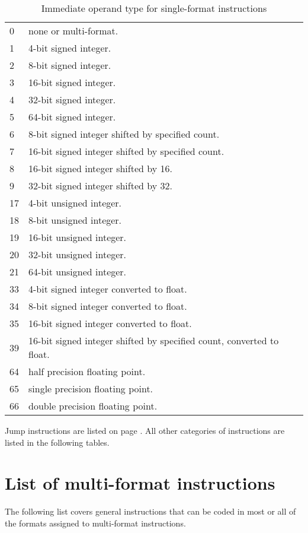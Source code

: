 \documentclass[forwardcom.tex]{subfiles}
\begin{document}
\begin{longtable} {|p{18mm}|p{100mm}|}
\caption{
Immediate operand type for single-format instructions} 
\label{table:immediateOperantTypesInInstructionList}
\\
\endfirsthead
\endhead
\hline
0 & none or multi-format. \\
1 & 4-bit signed integer. \\
2 & 8-bit signed integer. \\
3 & 16-bit signed integer. \\
4 & 32-bit signed integer. \\
5 & 64-bit signed integer. \\
6 & 8-bit signed integer shifted by specified count. \\
7 & 16-bit signed integer shifted by specified count. \\
8 & 16-bit signed integer shifted by 16. \\
9 & 32-bit signed integer shifted by 32. \\
17 & 4-bit unsigned integer. \\
18 & 8-bit unsigned integer. \\
19 & 16-bit unsigned integer. \\
20 & 32-bit unsigned integer. \\
21 & 64-bit unsigned integer. \\
33 & 4-bit signed integer converted to float. \\
34 & 8-bit signed integer converted to float. \\
35 & 16-bit signed integer converted to float. \\
39 & 16-bit signed integer shifted by specified count, converted to float. \\
64 & half precision floating point. \\
65 & single precision floating point. \\
66 & double precision floating point. \\
\hline
\end{longtable}

Jump instructions are listed on page \pageref{table:controlTransferInstructions}. All other categories of instructions are listed in the following tables.

\section{List of multi-format instructions}
The following list covers general instructions that can be coded in most or all of the formats
assigned to multi-format instructions.
\end{document}
